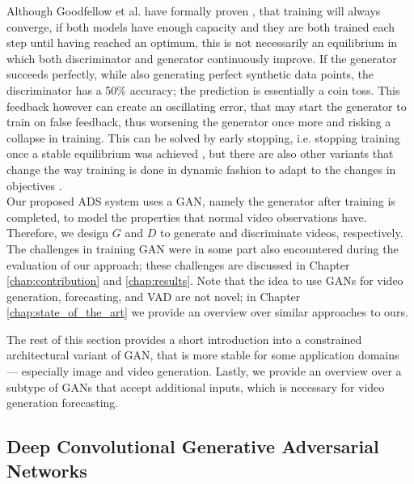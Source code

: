 Although Goodfellow et al. have formally proven \cite{goodfellow2014generative}, that training will always converge, if both models have enough capacity and they are both trained each step until having reached an optimum, this is not necessarily an equilibrium in which both discriminator and generator continuously improve. If the generator succeeds perfectly, while also generating perfect synthetic data points, the discriminator has a 50\% accuracy; the prediction is essentially a coin toss. This feedback however can create an oscillating error, that may start the generator to train on false feedback, thus worsening the generator once more and risking a collapse in training. This can be solved by early stopping, i.e. stopping training once a stable equilibrium was achieved \cite{yao2007early}, but there are also other variants that change the way training is done in dynamic fashion to adapt to the changes in objectives \cite{zhang2018convergence, thanh2020catastrophic}.\\

Our proposed ADS system uses a GAN, namely the generator after training is completed, to model the properties that normal video observations have. Therefore, we design $G$ and $D$ to generate and discriminate videos, respectively. The challenges in training GAN were in some part also encountered during the evaluation of our approach; these challenges are discussed in Chapter \ref{chap:contribution} and \ref{chap:results}. Note that the idea to use GANs for video generation, forecasting, and VAD are not novel; in Chapter \ref{chap:state_of_the_art} we provide an overview over similar approaches to ours. 

The rest of this section provides a short introduction into a constrained architectural variant of GAN, that is more stable for some application domains --- especially image and video generation. Lastly, we provide an overview over a subtype of GANs that accept additional inputs, which is necessary for video generation forecasting.


\subsection{Deep Convolutional Generative Adversarial Networks} \label{subsec:dcgan}

